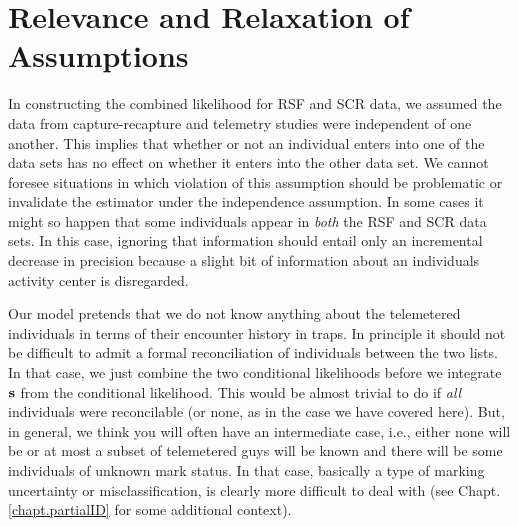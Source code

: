 






























\section{Relevance and Relaxation of Assumptions}


In constructing the combined likelihood for RSF and SCR data, we
assumed the data from capture-recapture and telemetry studies were
independent of one another. This implies that whether or not an
individual enters into one of the data sets has no effect on whether
it enters into the other data set.  We cannot foresee situations in
which violation of this assumption should be problematic or invalidate
the estimator under the independence assumption.  In some cases it
might so happen that some individuals appear in {\it both} the RSF and
SCR data sets. In this case, ignoring that information should entail
only an incremental decrease in precision because a slight bit of
information about an individuals activity center is disregarded.

 Our model pretends that we do not know anything
about the telemetered individuals in terms of their encounter history
in traps. In principle it should not be difficult to admit a formal
reconciliation of individuals between the two lists. In that case, we
just combine the two conditional likelihoods before we integrate ${\bf
  s}$ from the conditional likelihood. This would be almost trivial to
do if {\it all} individuals were reconcilable (or none, as in the case
we have covered here). But, in general, we think you will often have
an intermediate case, i.e., either none will be or at most a subset
of telemetered guys will be known and there will be some individuals
of unknown mark status.
In that case, basically a type of marking uncertainty or
misclassification, is clearly more difficult to deal with
(see
Chapt. \ref{chapt.partialID} for some additional context).

